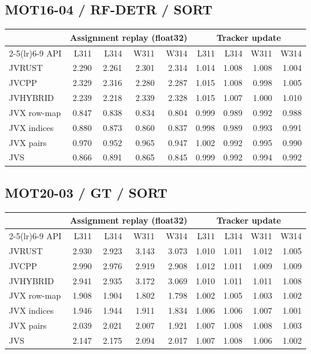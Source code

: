 \subsection*{MOT16-04 / RF-DETR / SORT}
\begin{center}\small
\begin{tabular}{@{}lrrrrrrrr@{}}
\toprule
 & \multicolumn{4}{c}{Assignment replay (float32)} & \multicolumn{4}{c}{Tracker update} \\
\cmidrule(lr){2-5}\cmidrule(lr){6-9}
API & L311 & L314 & W311 & W314 & L311 & L314 & W311 & W314 \\
\midrule
JVRUST & 2.290 & 2.261 & 2.301 & 2.314 & 1.014 & 1.008 & 1.008 & 1.004 \\
JVCPP & 2.329 & 2.316 & 2.280 & 2.287 & 1.015 & 1.008 & 0.998 & 1.005 \\
JVHYBRID & 2.239 & 2.218 & 2.339 & 2.328 & 1.015 & 1.007 & 1.000 & 1.010 \\
JVX row-map & 0.847 & 0.838 & 0.834 & 0.804 & 0.999 & 0.989 & 0.992 & 0.988 \\
JVX indices & 0.880 & 0.873 & 0.860 & 0.837 & 0.998 & 0.989 & 0.993 & 0.991 \\
JVX pairs & 0.970 & 0.952 & 0.965 & 0.947 & 1.002 & 0.992 & 0.995 & 0.990 \\
JVS & 0.866 & 0.891 & 0.865 & 0.845 & 0.999 & 0.992 & 0.994 & 0.992 \\
\bottomrule
\end{tabular}
\end{center}
\clearpage
\subsection*{MOT20-03 / GT / SORT}
\begin{center}\small
\begin{tabular}{@{}lrrrrrrrr@{}}
\toprule
 & \multicolumn{4}{c}{Assignment replay (float32)} & \multicolumn{4}{c}{Tracker update} \\
\cmidrule(lr){2-5}\cmidrule(lr){6-9}
API & L311 & L314 & W311 & W314 & L311 & L314 & W311 & W314 \\
\midrule
JVRUST & 2.930 & 2.923 & 3.143 & 3.073 & 1.010 & 1.011 & 1.012 & 1.005 \\
JVCPP & 2.990 & 2.976 & 2.919 & 2.908 & 1.012 & 1.011 & 1.009 & 1.009 \\
JVHYBRID & 2.941 & 2.935 & 3.172 & 3.069 & 1.010 & 1.011 & 1.011 & 1.008 \\
JVX row-map & 1.908 & 1.904 & 1.802 & 1.798 & 1.002 & 1.005 & 1.003 & 1.002 \\
JVX indices & 1.946 & 1.944 & 1.911 & 1.834 & 1.006 & 1.006 & 1.007 & 1.001 \\
JVX pairs & 2.039 & 2.021 & 2.007 & 1.921 & 1.007 & 1.008 & 1.008 & 1.003 \\
JVS & 2.147 & 2.175 & 2.094 & 2.017 & 1.007 & 1.008 & 1.006 & 1.002 \\
\bottomrule
\end{tabular}
\end{center}
